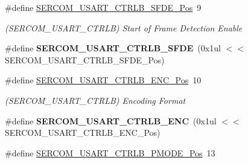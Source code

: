 \begin{DoxyCompactItemize}
\item 
\hypertarget{group___s_a_m_l21___s_e_r_c_o_m_ga5b0e8936c3d3be3ccc62eadbbc21df69}{}\#define \hyperlink{group___s_a_m_l21___s_e_r_c_o_m_ga5b0e8936c3d3be3ccc62eadbbc21df69}{S\+E\+R\+C\+O\+M\+\_\+\+U\+S\+A\+R\+T\+\_\+\+C\+T\+R\+L\+B\+\_\+\+S\+F\+D\+E\+\_\+\+Pos}~9\label{group___s_a_m_l21___s_e_r_c_o_m_ga5b0e8936c3d3be3ccc62eadbbc21df69}

\begin{DoxyCompactList}\small\item\em (S\+E\+R\+C\+O\+M\+\_\+\+U\+S\+A\+R\+T\+\_\+\+C\+T\+R\+L\+B) Start of Frame Detection Enable \end{DoxyCompactList}\item 
\hypertarget{group___s_a_m_l21___s_e_r_c_o_m_ga6664bd58a6a47b14f50982b33407e52d}{}\#define {\bfseries S\+E\+R\+C\+O\+M\+\_\+\+U\+S\+A\+R\+T\+\_\+\+C\+T\+R\+L\+B\+\_\+\+S\+F\+D\+E}~(0x1ul $<$$<$ S\+E\+R\+C\+O\+M\+\_\+\+U\+S\+A\+R\+T\+\_\+\+C\+T\+R\+L\+B\+\_\+\+S\+F\+D\+E\+\_\+\+Pos)\label{group___s_a_m_l21___s_e_r_c_o_m_ga6664bd58a6a47b14f50982b33407e52d}

\item 
\hypertarget{group___s_a_m_l21___s_e_r_c_o_m_ga45df1ea385a685b6585ebc5940d40f65}{}\#define \hyperlink{group___s_a_m_l21___s_e_r_c_o_m_ga45df1ea385a685b6585ebc5940d40f65}{S\+E\+R\+C\+O\+M\+\_\+\+U\+S\+A\+R\+T\+\_\+\+C\+T\+R\+L\+B\+\_\+\+E\+N\+C\+\_\+\+Pos}~10\label{group___s_a_m_l21___s_e_r_c_o_m_ga45df1ea385a685b6585ebc5940d40f65}

\begin{DoxyCompactList}\small\item\em (S\+E\+R\+C\+O\+M\+\_\+\+U\+S\+A\+R\+T\+\_\+\+C\+T\+R\+L\+B) Encoding Format \end{DoxyCompactList}\item 
\hypertarget{group___s_a_m_l21___s_e_r_c_o_m_ga1bef37fed9555aa34ab051cc9ab7b0b7}{}\#define {\bfseries S\+E\+R\+C\+O\+M\+\_\+\+U\+S\+A\+R\+T\+\_\+\+C\+T\+R\+L\+B\+\_\+\+E\+N\+C}~(0x1ul $<$$<$ S\+E\+R\+C\+O\+M\+\_\+\+U\+S\+A\+R\+T\+\_\+\+C\+T\+R\+L\+B\+\_\+\+E\+N\+C\+\_\+\+Pos)\label{group___s_a_m_l21___s_e_r_c_o_m_ga1bef37fed9555aa34ab051cc9ab7b0b7}

\item 
\hypertarget{group___s_a_m_l21___s_e_r_c_o_m_gaf2edd68e5c378c90d6b689bb99a50a75}{}\#define \hyperlink{group___s_a_m_l21___s_e_r_c_o_m_gaf2edd68e5c378c90d6b689bb99a50a75}{S\+E\+R\+C\+O\+M\+\_\+\+U\+S\+A\+R\+T\+\_\+\+C\+T\+R\+L\+B\+\_\+\+P\+M\+O\+D\+E\+\_\+\+Pos}~13\label{group___s_a_m_l21___s_e_r_c_o_m_gaf2edd68e5c378c90d6b689bb99a50a75}


\end{DoxyCompactItemize}
